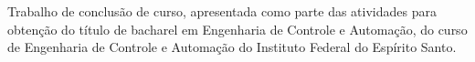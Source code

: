 {
\center          
{\large\MakeUppercase{\imprimirautor}}\par
\vfill
{\bfseries\large\MakeUppercase\imprimirtitulo}\par
\vspace{10 mm}
\hspace{.35\textwidth}
\begin{minipage}{.6\textwidth}
    \SingleSpacing
    Trabalho de conclusão de curso, apresentada como parte das atividades para obtenção do título de bacharel em Engenharia de Controle e Automação, do curso de Engenharia de Controle e Automação do Instituto Federal do Espírito Santo. 
    \par
    \par
    \vspace{0.5cm}
    \imprimirorientadorRotulo
    {\large  } \imprimirorientador\par
    \imprimircoorientadorRotulo
    {\large  } \imprimircoorientador\par
\end{minipage}
\vfill 
\vfill
{\large\MakeUppercase\imprimirlocal}\par
{\large\imprimirdata}\par
}